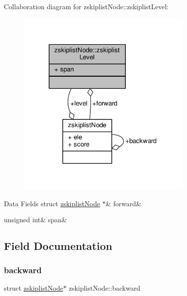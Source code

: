 Collaboration diagram for zskiplist\+Node\+:\+:zskiplist\+Level\+:\nopagebreak
\begin{figure}[H]
\begin{center}
\leavevmode
\includegraphics[width=247pt]{structzskiplistNode_1_1zskiplistLevel__coll__graph}
\end{center}
\end{figure}
\begin{DoxyFields}{Data Fields}
\mbox{\label{structzskiplistNode_a75a10d635dcfd265211e7946b583a414}} 
struct \hyperlink{structzskiplistNode}{zskiplistNode} $\ast$&
forward&
\\
\hline

\mbox{\label{structzskiplistNode_a2a622fa43f8fccd04b7b5c3efc829f50}} 
unsigned int&
span&
\\
\hline

\end{DoxyFields}


\subsection{Field Documentation}
\mbox{\label{structzskiplistNode_a265aacf3a74993081652f73e66a16c8a}} 
\subsubsection{\texorpdfstring{backward}{backward}}
{\footnotesize\ttfamily struct \hyperlink{structzskiplistNode}{zskiplist\+Node}$\ast$ zskiplist\+Node\+::backward}



